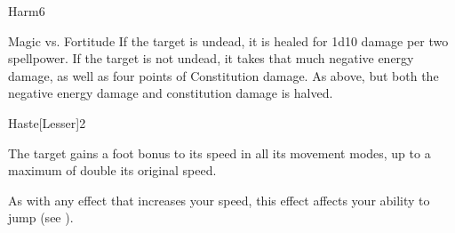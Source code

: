 \begin{spellsection}{Harm}{6}
    \begin{spellheader}
    \end{spellheader}
    \begin{spellcontent}
        \begin{spelltargetinginfo}
        \end{spelltargetinginfo}
        \begin{spelleffects}
            \begin{spellattack}{Magic vs. Fortitude}
                \spelleffect If the target is undead, it is healed for 1d10 damage per two spellpower.
                \spellsuccess If the target is not undead, it takes that much negative energy damage, as well as four points of Constitution damage.
                \spellfailure As above, but both the negative energy damage and constitution damage is halved.
            \end{spellattack}
        \end{spelleffects}
    \end{spellcontent}
    \begin{spellfooter}
        \miscastrandom
    \end{spellfooter}
\end{spellsection}

\begin{spellsection}{Haste}[Lesser]{2}
    \begin{spellheader}
    \end{spellheader}
    \begin{spellcontent}
        \begin{spelltargetinginfo}
        \end{spelltargetinginfo}
        \begin{spelleffects}
            \spelleffect The target gains a  foot bonus to its speed in all its movement modes, up to a maximum of double its original speed.
            \spelldur \durshort \dismissable
        \end{spelleffects}
    \end{spellcontent}
    \begin{spellfooter}
        \spellnotes As with any effect that increases your speed, this effect affects your ability to jump (see ).
        \miscastrandom
    \end{spellfooter}
\end{spellsection}

